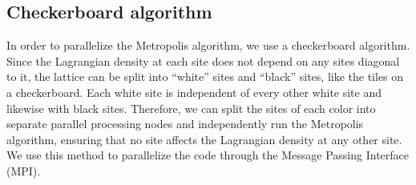 \documentclass[12pt]{report}
\begin{document}
\subsection{Checkerboard algorithm}

In order to parallelize the Metropolis algorithm, we use a checkerboard algorithm. Since the Lagrangian density at each site does not depend on any sites diagonal to it, the lattice can be split into ``white'' sites and ``black'' sites, like the tiles on a checkerboard. Each white site is independent of every other white site and likewise with black sites. Therefore, we can split the sites of each color into separate parallel processing nodes and independently run the Metropolis algorithm, ensuring that no site affects the Lagrangian density at any other site. We use this method to parallelize the code through the Message Passing Interface (MPI).
\end{document}
